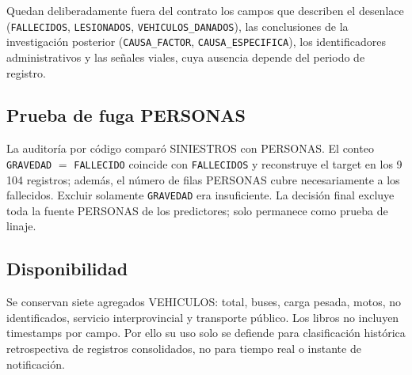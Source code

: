 Quedan deliberadamente fuera del contrato los campos que describen el desenlace (\texttt{FALLECIDOS}, \texttt{LESIONADOS}, \texttt{VEHICULOS\_DANADOS}), las conclusiones de la investigación posterior (\texttt{CAUSA\_FACTOR}, \texttt{CAUSA\_ESPECIFICA}), los identificadores administrativos y las señales viales, cuya ausencia depende del periodo de registro.

\subsection{Prueba de fuga PERSONAS}
La auditoría por código comparó SINIESTROS con PERSONAS. El conteo \texttt{GRAVEDAD} $=$ \texttt{FALLECIDO} coincide con \texttt{FALLECIDOS} y reconstruye el target en los 9\,104 registros; además, el número de filas PERSONAS cubre necesariamente a los fallecidos. Excluir solamente \texttt{GRAVEDAD} era insuficiente. La decisión final excluye toda la fuente PERSONAS de los predictores; solo permanece como prueba de linaje.

\subsection{Disponibilidad}
Se conservan siete agregados VEHICULOS: total, buses, carga pesada, motos, no identificados, servicio interprovincial y transporte público. Los libros no incluyen timestamps por campo. Por ello su uso solo se defiende para clasificación histórica retrospectiva de registros consolidados, no para tiempo real o instante de notificación.
